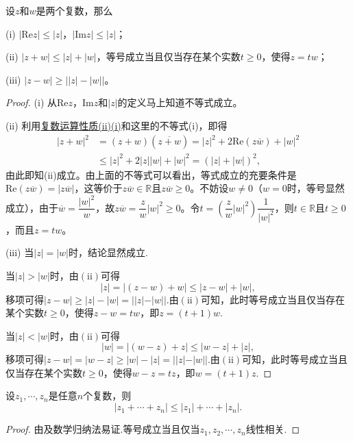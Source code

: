 \documentclass[../../main.tex]{subfiles}
\begin{document}
\begin{proposition}\label{proposition:复数基本不等式}
设\(z\)和\(w\)是两个复数，那么

(i) \(|\mathrm{Re}z| \leqslant |z|\)，\(|\mathrm{Im}z| \leqslant |z|\)；

(ii) \(|z + w| \leqslant |z| + |w|\)，等号成立当且仅当存在某个实数\(t \geqslant 0\)，使得\(z = tw\)；

(iii) \(|z - w| \geqslant \big||z| - |w|\big|\)。
\end{proposition}
\begin{proof}
(i) 从\(\mathrm{Re}z\)，\(\mathrm{Im}z\)和\(|z|\)的定义马上知道不等式成立。

(ii) 利用\hyperref[proposition:复数运算性质]{复数运算性质(ii)(i)}和这里的不等式(i)，即得
\[
\begin{split}
|z + w|^2 &= (z + w)(\overline{z + w}) = |z|^2 + 2\mathrm{Re}(z\overline{w}) + |w|^2 \\
& \leqslant |z|^2 + 2|z||w| + |w|^2 = (|z| + |w|)^2,
\end{split}
\]
由此即知(ii)成立。由上面的不等式可以看出，等式成立的充要条件是\(\mathrm{Re}(z\overline{w}) = |z\overline{w}|\)，这等价于$z\overline{w}\in \mathbb{R}$且\(z\overline{w} \geqslant 0\)。不妨设\(w \neq 0\)（\(w = 0\)时，等号显然成立），由于\(\overline{w} = \dfrac{|w|^2}{w}\)，故\(z\overline{w}=\dfrac{z}{w}|w|^2 \geqslant 0\)。令\(t = \left( \dfrac{z}{w}|w|^2 \right) \dfrac{1}{|w|^2}\)，则$t\in \mathbb{R}$且\(t \geqslant 0\)，而且\(z = tw\)。

(iii) 当\(| z | = | w |\)时，结论显然成立.

当\(| z | > | w |\)时，由\((\mathrm{ii})\)可得
\[| z | = | (z - w) + w | \leqslant | z - w | + | w |,\]
移项可得\(| z - w | \geqslant | z | - | w | = | | z | - | w | |\).由\((\mathrm{ii})\)可知，此时等号成立当且仅当存在某个实数\(t \geqslant 0\)，使得\(z - w = tw\)，即\(z = (t + 1)w\).

当\(| z | < | w |\)时，由\((\mathrm{ii})\)可得
\[| w | = | (w - z) + z | \leqslant | w - z | + | z |,\]
移项可得\(| z - w | = | w - z | \geqslant | w | - | z | = | | z | - | w | |\).由\((\mathrm{ii})\)可知，此时等号成立当且仅当存在某个实数\(t \geqslant 0\)，使得\(w - z = tz\)，即\(w = (t + 1)z\).
\end{proof}

\begin{corollary}
设\(z_1, \cdots, z_n\)是任意\(n\)个复数，则
\[
|z_1 + \cdots + z_n| \leqslant |z_1| + \cdots + |z_n|.
\]
\end{corollary}
\begin{proof}
由及数学归纳法易证.等号成立当且仅当$z_1,z_2,\cdots,z_n$线性相关.
\end{proof}
\end{document}
